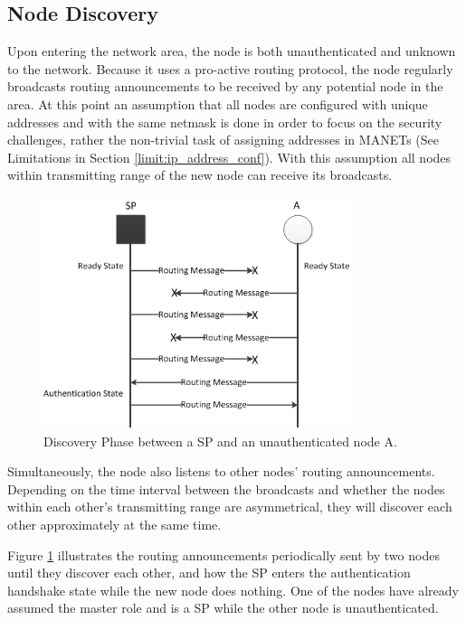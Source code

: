 \subsection{Node Discovery}
Upon entering the network area, the node is both unauthenticated and unknown to
the network. Because it uses a pro-active routing protocol, the node regularly
broadcasts routing announcements to be received by any potential node in the
area. At this point an assumption that all nodes are configured with unique
addresses and with the same netmask is done in order to focus on the security
challenges, rather the non-trivial task of assigning addresses in \acp{MANET}
(See Limitations in Section \ref{limit:ip_address_conf}). With this assumption all
nodes within transmitting range of the new node can receive its broadcasts.

\begin{figure}[h]
	\centering
  	\includegraphics[width=0.8\textwidth]{images/node_states_discovery.png}
  	\caption{Discovery Phase between a SP and an unauthenticated node A.}
	\label{fig:node_states_discovery}
\end{figure}

Simultaneously, the node also listens to other nodes' routing announcements.
Depending on the time interval between the broadcasts and whether the nodes
within each other's transmitting range are asymmetrical, they will discover each
other approximately at the same time.

Figure \ref{fig:node_states_discovery} illustrates the routing announcements
periodically sent by two nodes until they discover each other, and how the SP
enters the authentication handshake state while the new node does nothing. One
of the nodes have already assumed the master role and is a \ac{SP} while the
other node is unauthenticated.

